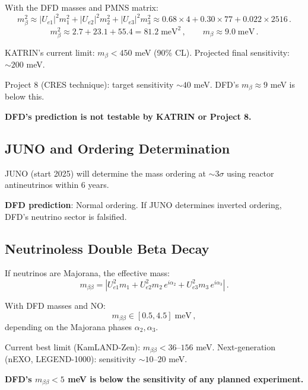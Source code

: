 \documentclass[11pt,a4paper]{article}
\begin{document}
With the DFD masses and PMNS matrix:
\begin{equation}
m_\beta^2 \approx |U_{e1}|^2 m_1^2 + |U_{e2}|^2 m_2^2 + |U_{e3}|^2 m_3^2 \approx 0.68 \times 4 + 0.30 \times 77 + 0.022 \times 2516\,.
\end{equation}
\begin{equation}
m_\beta^2 \approx 2.7 + 23.1 + 55.4 = 81.2\;\mathrm{meV}^2\,,\qquad m_\beta \approx 9.0\;\mathrm{meV}\,.
\end{equation}

KATRIN's current limit: $m_\beta < 450$ meV (90\% CL). Projected final sensitivity: $\sim 200$ meV.

Project 8 (CRES technique): target sensitivity $\sim 40$ meV. DFD's $m_\beta \approx 9$ meV is below this.

\textbf{DFD's prediction is not testable by KATRIN or Project 8.}

\subsection{JUNO and Ordering Determination}

JUNO (start 2025) will determine the mass ordering at $\sim 3\sigma$ using reactor antineutrinos within 6 years.

\textbf{DFD prediction}: Normal ordering. If JUNO determines inverted ordering, DFD's neutrino sector is falsified.

\subsection{Neutrinoless Double Beta Decay}

If neutrinos are Majorana, the effective mass:
\begin{equation}
m_{\beta\beta} = |U_{e1}^2 m_1 + U_{e2}^2 m_2\,e^{i\alpha_2} + U_{e3}^2 m_3\,e^{i\alpha_3}|\,.
\end{equation}

With DFD masses and NO:
\begin{equation}
m_{\beta\beta} \in [0.5, 4.5]\;\mathrm{meV}\,,
\end{equation}
depending on the Majorana phases $\alpha_2, \alpha_3$.

Current best limit (KamLAND-Zen): $m_{\beta\beta} < 36$--$156$ meV. Next-generation (nEXO, LEGEND-1000): sensitivity $\sim 10$--$20$ meV.

\textbf{DFD's $m_{\beta\beta} < 5$ meV is below the sensitivity of any planned experiment.}
\end{document}
